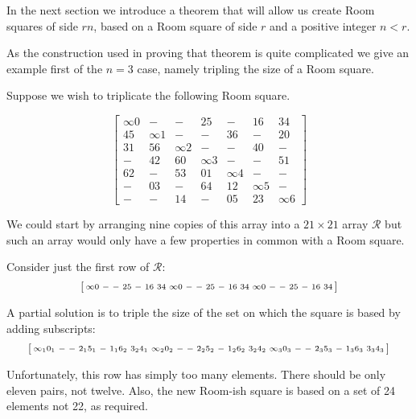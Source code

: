 In the next section we introduce a theorem that will allow us create Room squares of side $rn$, based on a Room square of side $r$ and a positive integer $n < r$.

As the construction used in proving that theorem is quite complicated we give an example first of the $n = 3$ case, namely tripling the size of a Room square.

\begin{example}
Suppose we wish to triplicate the following Room square.

\begin{equation}
  \begin{bmatrix}
    \infty 0 &   - &  -  &  25 &   - &  16 &  34 \\
    45 &  \infty 1 &  -  &   - &  36 &   - &  20 \\
    31 &  56 &  \infty 2 &   - &   - &  40 &   - \\
     - &  42 &  60 &  \infty 3 &   - &   - &  51 \\
    62 &   - &  53 &  01 &  \infty 4 &   - &   - \\
     - &  03 &   - &  64 &  12 &  \infty 5 &   - \\
     - &   - &  14 &   - &  05 &  23 &  \infty 6 
  \end{bmatrix}
  \label{eq:triple-room}
\end{equation}

We could start by arranging nine copies of this array into a $21 \times 21$ array $\mathcal{R}$ but such an array would only have a few properties in common with a Room square.

Consider just the first row of $\mathcal{R}$:
\begin{equation*}
  \begin{bsmallmatrix}
    \infty 0 & - & - & 25 & - & 16 & 34 & \infty 0 & - & - & 25 & - & 16 & 34 & \infty 0 & - & - & 25 & - & 16 & 34 \\
  \end{bsmallmatrix}
\end{equation*}

A partial solution is to triple the size of the set on which the square is based by adding subscripts:
\begin{equation*}
  \begin{bsmallmatrix}
    \infty_{1} 0_{1} & - & - & 2_{1}5_{1} & - & 1_{1}6_{2} & 3_{2}4_{1} & \infty_{2} 0_{2} & - & - & 2_{2}5_{2} & - & 1_{2}6_{2} & 3_{2}4_{2} & \infty_{3} 0_{3} & - & - & 2_{3}5_{3} & - & 1_{3}6_{3} & 3_{3}4_{3} \\
  \end{bsmallmatrix}
\end{equation*}

Unfortunately, this row has simply too many elements.
There should be only eleven pairs, not twelve.
Also, the new Room-ish square is based on a set of 24 elements not 22, as required.
\end{example}

